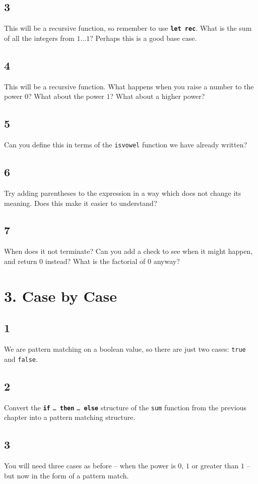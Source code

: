 \documentclass[]{book}
\newcommand{\pelse}{\textbf{else}\xspace}
\begin{document}
\subsection*{3}
This will be a recursive function, so remember to use \textbf{\texttt{let rec}}. What is the sum of all the integers from $1\ldots 1$? Perhaps this is a good base case. 
\subsection*{4}
This will be a recursive function. What happens when you raise a number to the power $0$? What about the power $1$? What about a higher power?
\subsection*{5}
Can you define this in terms of the \texttt{isvowel} function we have already written?
\subsection*{6}
Try adding parentheses to the expression in a way which does not change its meaning. Does this make it easier to understand?
\subsection*{7}
When does it not terminate? Can you add a check to see when it might happen, and return $0$ instead? What is the factorial of $0$ anyway?
\section*{3. Case by Case}
\subsection*{1}
We are pattern matching on a boolean value, so there are just two cases: \texttt{true} and \texttt{false}.
\subsection*{2}
Convert the \textbf{\texttt{if}} \texttt{\ldots\ }\textbf{\texttt{then}} \texttt{\ldots\ }\textbf{\texttt{\pelse}} structure of the \texttt{sum} function from the previous chapter into a pattern matching structure.
\subsection*{3}
You will need three cases as before -- when the power is $0$, $1$ or greater than $1$ -- but now in the form of a pattern match.
\end{document}
